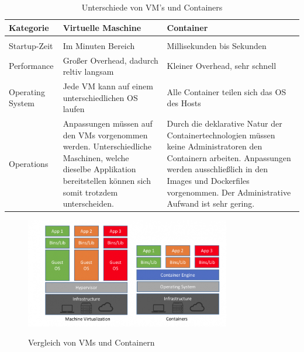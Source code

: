 \begin{table}
        \centering
        \begin{tabular}{ | p{} | p{} | p{} | }
        Kategorie & Virtuelle Maschine & Container \\
        \hline \\
        Startup-Zeit & Im Minuten Bereich & Millisekunden bis Sekunden \\
        Performance & Großer Overhead, dadurch reltiv langsam & Kleiner Overhead, sehr schnell\\
        Operating System & Jede \ac{VM} kann auf einem unterschiedlichen \ac{OS} laufen & Alle Container teilen sich das \ac{OS} des Hosts \\
        Operations & Anpassungen müssen auf den \ac{VM}s vorgenommen werden. Unterschiedliche Maschinen, welche dieselbe Applikation bereitstellen können sich somit trotzdem unterscheiden. & Durch die deklarative Natur der Containertechnologien müssen keine Administratoren den Containern arbeiten. Anpassungen werden ausschließlich in den Images und Dockerfiles vorgenommen. Der Administrative Aufwand ist sehr gering. \\
        \end{tabular}
        \caption{Unterschiede von VM's und Containers}
        \label{table:comparison_vm_container}
\end{table}

\begin{figure}
        \caption{Vergleich von \ac{VM}s und Containern\cite{vm_vs_container}}
        \centering
        \includegraphics[width=0.8\textwidth]{bilder/comparison_vm_container.png}
        \label{fig:comparison_vm_container}
\end{figure}

